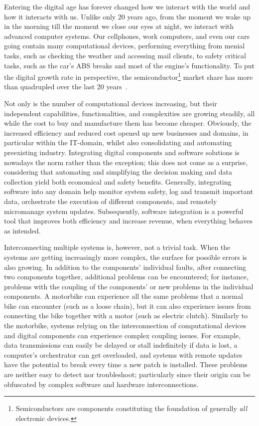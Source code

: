 Entering the digital age has forever changed how we interact with the world and how it interacts with us.
Unlike only 20 years ago, from the moment we wake up in the morning till the moment we close our eyes at night, we interact with advanced computer systems.
Our cellphones, work computers, and even our cars going contain many computational devices, performing everything from menial tasks, such as checking the weather and accessing mail clients, to safety critical tasks, such as the car's ABS breaks and most of the engine's functionality.
To put the digital growth rate in perspective, the semiconductor\footnote{Semiconductors are components constituting the foundation of generally \emph{all} electronic devices.} market share has more than quadrupled over the last 20 years~\cite{statista:2022}.

Not only is the number of computational devices increasing, but their independent capabilities, functionalities, and complexities are growing steadily, all while the cost to buy and manufacture them has become cheaper.
Obviously, the increased efficiency and reduced cost opened up new businesses and domains, in particular within the IT-domain, whilst also consolidating and automating preexisting industry.
Integrating digital components and software solutions is nowadays the norm rather than the exception; this does not come as a surprise, considering that automating and simplifying the decision making and data collection yield both economical and safety benefits.
Generally, integrating software into any domain help monitor system safety, log and transmit important data, orchestrate the execution of different components, and remotely micromanage system updates.
Subsequently, software integration is a powerful tool that improves both efficiency and increase revenue, when everything behaves as intended.

Interconnecting multiple systems is, however, not a trivial task.
When the systems are getting increasingly more complex, the surface for possible errors is also growing.
In addition to the components' individual faults, after connecting two components together, additional problems can be encountered; for instance, problems with the coupling of the components' or new problems in the individual components.
A motorbike can experience all the same problems that a normal bike can encounter (such as a loose chain), but it can also experience issues from connecting the bike together with a motor (such as electric clutch).
Similarly to the motorbike, systems relying on the interconnection of computational devices and digital components can experience complex coupling issues.
For example, data transmissions can easily be delayed or stall indefinitely if data is lost, a computer's orchestrator can get overloaded, and systems with remote updates have the potential to break every time a new patch is installed.
These problems are neither easy to detect nor troubleshoot; particularly since their origin can be obfuscated by complex software and hardware interconnections.

